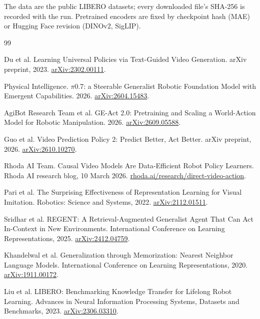 \documentclass[10pt,twocolumn,letterpaper]{article}
\begin{document}
The data are the public LIBERO datasets; every downloaded file's SHA-256 is recorded with the run. Pretrained encoders are fixed by checkpoint hash (MAE) or Hugging Face revision (DINOv2, SigLIP).


\fussy

\clearpage  %

{\footnotesize\setlength{\itemsep}{1pt}
\begin{thebibliography}{99}

Du et al. Learning Universal Policies via Text-Guided Video Generation. arXiv preprint, 2023. \href{https://arxiv.org/abs/2302.00111}{arXiv:2302.00111}.

Physical Intelligence. \ensuremath{\pi}0.7: a Steerable Generalist Robotic Foundation Model with Emergent Capabilities. 2026. \href{https://arxiv.org/abs/2604.15483}{arXiv:2604.15483}.

AgiBot Research Team et al. GE-Act 2.0: Pretraining and Scaling a World-Action Model for Robotic Manipulation. 2026. \href{https://arxiv.org/abs/2609.05588}{arXiv:2609.05588}.

Guo et al. Video Prediction Policy 2: Predict Better, Act Better. arXiv preprint, 2026. \href{https://arxiv.org/abs/2610.10270}{arXiv:2610.10270}.

Rhoda AI Team. Causal Video Models Are Data-Efficient Robot Policy Learners. Rhoda AI research blog, 10 March 2026. \href{https://www.rhoda.ai/research/direct-video-action}{rhoda.ai/research/direct-video-action}.

Pari et al. The Surprising Effectiveness of Representation Learning for Visual Imitation. Robotics: Science and Systems, 2022. \href{https://arxiv.org/abs/2112.01511}{arXiv:2112.01511}.

Sridhar et al. REGENT: A Retrieval-Augmented Generalist Agent That Can Act In-Context in New Environments. International Conference on Learning Representations, 2025. \href{https://arxiv.org/abs/2412.04759}{arXiv:2412.04759}.

Khandelwal et al. Generalization through Memorization: Nearest Neighbor Language Models. International Conference on Learning Representations, 2020. \href{https://arxiv.org/abs/1911.00172}{arXiv:1911.00172}.

Liu et al. LIBERO: Benchmarking Knowledge Transfer for Lifelong Robot Learning. Advances in Neural Information Processing Systems, Datasets and Benchmarks, 2023. \href{https://arxiv.org/abs/2306.03310}{arXiv:2306.03310}.


\end{thebibliography}}
\end{document}
